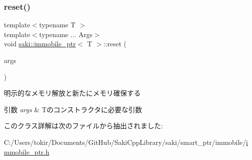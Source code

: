 \subsubsection{\texorpdfstring{reset()}{reset()}}
{\footnotesize\ttfamily template$<$typename T $>$ \\
template$<$typename ... Args$>$ \\
void \mbox{\hyperlink{classsaki_1_1immobile__ptr}{saki\+::immobile\+\_\+ptr}}$<$ T $>$\+::reset (\begin{DoxyParamCaption}\item[{Args ...}]{args }\end{DoxyParamCaption})\hspace{0.3cm}{\ttfamily [inline]}}



明示的なメモリ解放と新たにメモリ確保する 


\begin{DoxyParams}{引数}
{\em args} & Tのコンストラクタに必要な引数 \\
\hline
\end{DoxyParams}


このクラス詳解は次のファイルから抽出されました\+:\begin{DoxyCompactItemize}
\item 
C\+:/\+Users/tokir/\+Documents/\+Git\+Hub/\+Saki\+Cpp\+Library/saki/smart\+\_\+ptr/immobile/\mbox{\hyperlink{immobile__ptr_8h}{immobile\+\_\+ptr.\+h}}\end{DoxyCompactItemize}
